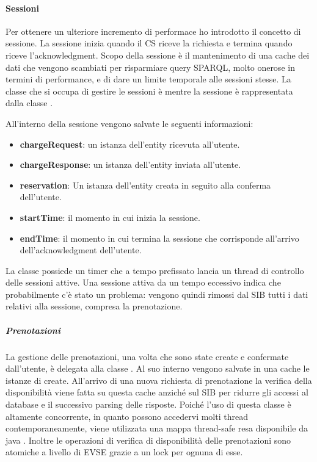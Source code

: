 \paragraph{Sessioni}

Per ottenere un ulteriore incremento di performace ho introdotto il concetto di sessione. La sessione inizia quando il CS riceve la richiesta e termina quando riceve l'acknowledgment. Scopo della sessione è il mantenimento di una cache dei dati che vengono scambiati per risparmiare query SPARQL, molto onerose in termini di performance, e di dare un limite temporale alle sessioni stesse. La classe che si occupa di gestire le sessioni è  mentre la sessione è rappresentata dalla classe .

All'interno della sessione vengono salvate le seguenti informazioni:

\begin{itemize}
	\item \textbf{chargeRequest}: un istanza dell'entity  ricevuta all'utente. 
	\item \textbf{chargeResponse}: un istanza dell'entity  inviata all'utente. 
	\item \textbf{reservation}: Un istanza dell'entity  creata in seguito alla conferma dell'utente.
	\item \textbf{startTime}: il momento in cui inizia la sessione.
	\item \textbf{endTime}: il momento in cui termina la sessione che corrisponde all'arrivo dell'acknowledgment dell'utente.
\end{itemize}

\noindent
La classe  possiede un timer che a tempo prefissato lancia un thread di controllo delle sessioni attive. Una sessione attiva da un tempo eccessivo indica che probabilmente c'è stato un problema: vengono quindi rimossi dal SIB tutti i dati relativi alla sessione, compresa la prenotazione.

\subparagraph{Prenotazioni}

La gestione delle prenotazioni, una volta che sono state create e confermate dall'utente, è delegata alla classe . Al suo interno vengono salvate in una cache le istanze di  create. All'arrivo di una nuova richiesta di prenotazione la verifica della disponibilità viene fatta su questa cache anziché sul SIB per ridurre gli accessi al database e il successivo parsing delle risposte.
Poiché l'uso di questa classe è altamente concorrente, in quanto possono accedervi molti thread contemporaneamente, viene utilizzata una mappa thread-safe resa disponibile da java . Inoltre le operazioni di verifica di disponibilità delle prenotazioni sono atomiche a livello di EVSE grazie a un lock per ognuna di esse. 

